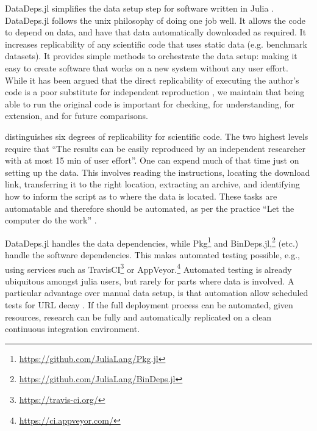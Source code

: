 \documentclass[dvinames]{jors}
\newcommand{\citep}[1]{\parencite{#1}}
\newcommand{\citet}[1]{\textcite{#1}}
\begin{document}
DataDeps.jl simplifies the data setup step for software written in Julia \citep{Julia}.
DataDeps.jl follows the unix philosophy of doing one job well.
It allows the code to depend on data, and have that data automatically downloaded as required.
It increases replicability of any scientific code that uses static data (e.g. benchmark datasets).
It provides simple methods to orchestrate the data setup: making it easy to create software that works on a new system without any user effort.
While it has been argued that the direct replicability of executing the author's code is a poor substitute for independent reproduction \citep{drummond2009replicability},
we maintain that being able to run the original code is important for checking, for understanding, for extension, and for future comparisons.


\citet{VabdewakkeReproduceableResearch} distinguishes six degrees of replicability for scientific code.
The two highest levels
require that ``The results can be easily reproduced by an independent researcher with at most 15 min of user effort''.
One can  expend much of that time just on setting up the data.
This involves reading the instructions, locating the download link, transferring it to the right location, extracting an archive, and identifying how to inform the script as to where the data is located.
These tasks are automatable and therefore should be automated, as per the practice  ``Let the computer do the work'' \citep{10.1371/journal.pbio.1001745}.


DataDeps.jl handles the data dependencies, while Pkg\footnote{\url{https://github.com/JuliaLang/Pkg.jl}} 
and BinDeps.jl,\footnote{\url{https://github.com/JuliaLang/BinDeps.jl}}
 (etc.) handle the software dependencies.
This makes automated testing possible, e.g., using services such as 
TravisCI\footnote{\url{https://travis-ci.org/}} or AppVeyor.\footnote{\url{https://ci.appveyor.com/}}
Automated testing is already ubiquitous amongst julia users, but rarely for parts where data is involved.
A particular advantage over manual data setup, is that automation allow scheduled tests for URL decay \citep{wren2008url}.
If the full deployment process can be automated, given resources, research can be fully and automatically replicated on a clean continuous integration environment.
\end{document}
